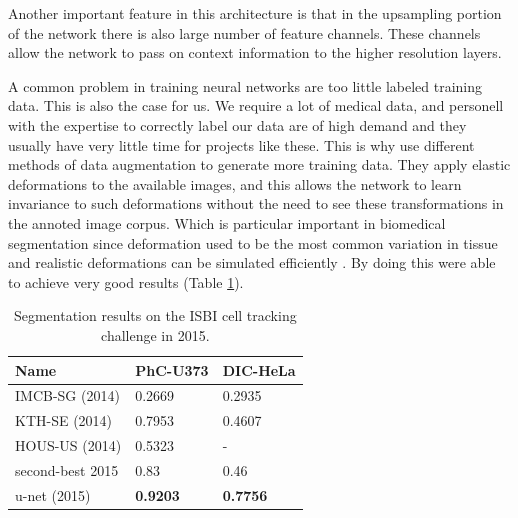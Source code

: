 \documentclass[english, a4paper]{article}
\begin{document}
Another important feature in this architecture is that in the upsampling portion of the network there is also large number of feature channels. These channels allow the network to pass on context information to the higher resolution layers. 

A common problem in training neural networks are too little labeled training data. This is also the case for us. We require a lot of medical data, and personell with the expertise to correctly label our data are of high demand and they usually have very little time for projects like these. This is why \citeauthor*{UNetConvolutional15} use different methods of data augmentation to generate more training data. They apply elastic deformations to the available images, and this allows the network to learn invariance to such deformations without the need to see these transformations in the annoted image corpus. Which is particular important in biomedical segmentation since deformation used to be the most common variation in tissue and realistic deformations can be simulated efficiently \cite{UNetConvolutional15}. By doing this \citeauthor*{UNetConvolutional15} were able to achieve very good results (Table \ref{table:segmentation_results}).

\begin{table} %
  \centering
  \begin{tabular}{ l l l }
  	\hline
    Name &				PhC-U373 &			DIC-HeLa 		\\
    \hline
    IMCB-SG (2014) &	0.2669 & 			0.2935 			\\
    KTH-SE (2014) &		0.7953 & 			0.4607 			\\ 
    HOUS-US (2014) &	0.5323 & 			- 				\\ 
    second-best 2015 &	0.83 & 				0.46 			\\
    u-net (2015) &		\textbf{0.9203} & 	\textbf{0.7756} \\
    \hline
  \end{tabular}
  \caption{Segmentation results on the ISBI cell tracking challenge in 2015.}
  \label{table:segmentation_results}
\end{table}
\end{document}
